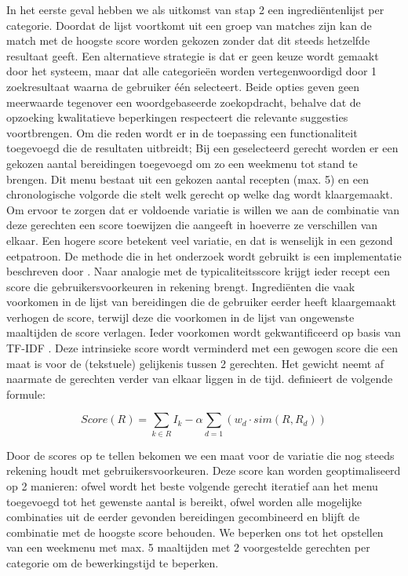 \documentclass{hogent-article}
\begin{document}
In het eerste geval hebben we als uitkomst van stap 2 een ingrediëntenlijst per categorie. Doordat de lijst voortkomt uit een groep van matches zijn kan de match met de hoogste score worden gekozen zonder dat dit steeds hetzelfde resultaat geeft. Een alternatieve strategie is dat er geen keuze wordt gemaakt door het systeem, maar dat alle categorieën worden vertegenwoordigd door 1 zoekresultaat waarna de gebruiker één selecteert.
Beide opties geven geen meerwaarde tegenover een woordgebaseerde zoekopdracht, behalve dat de opzoeking kwalitatieve beperkingen respecteert die relevante suggesties voortbrengen. Om die reden wordt er in de toepassing een functionaliteit toegevoegd die de resultaten uitbreidt; Bij een geselecteerd gerecht worden er een gekozen aantal bereidingen toegevoegd om zo een weekmenu tot stand te brengen. Dit menu bestaat uit een gekozen aantal recepten (max. 5) en een chronologische volgorde die stelt welk gerecht op welke dag wordt klaargemaakt. Om ervoor te zorgen dat er voldoende variatie is willen we aan de combinatie van deze gerechten een score toewijzen die aangeeft in hoeverre ze verschillen van elkaar. Een hogere score betekent veel variatie, en dat is wenselijk in een gezond eetpatroon. 
De methode die in het onderzoek wordt gebruikt is een implementatie beschreven door \textcite{Ueda2011}. Naar analogie met de typicaliteitsscore krijgt ieder recept een score die gebruikersvoorkeuren in rekening brengt. Ingrediënten die vaak voorkomen in de lijst van bereidingen die de gebruiker eerder heeft klaargemaakt verhogen de score, terwijl deze die voorkomen in de lijst van ongewenste maaltijden de score verlagen. Ieder voorkomen wordt gekwantificeerd op basis van TF-IDF \autocite{Karabiber2024}. Deze intrinsieke score wordt verminderd met een gewogen score die een maat is voor de (tekstuele) gelijkenis tussen 2 gerechten. Het gewicht neemt af naarmate de gerechten verder van elkaar liggen in de tijd. \textcite{Ueda2011} definieert de volgende formule:

\begin{equation}
    Score(R) = \sum_{k \in R}I_k - \alpha \sum_{d=1}(w_d \cdot sim(R,R_d))
\end{equation}

Door de scores op te tellen bekomen we een maat voor de variatie die nog steeds rekening houdt met gebruikersvoorkeuren. Deze score kan worden geoptimaliseerd op 2 manieren: ofwel wordt het beste volgende gerecht iteratief aan het menu toegevoegd tot het gewenste aantal is bereikt, ofwel worden alle mogelijke combinaties uit de eerder gevonden bereidingen gecombineerd en blijft de combinatie met de hoogste score behouden. We beperken ons tot het opstellen van een weekmenu met max. 5 maaltijden met 2 voorgestelde gerechten per categorie om de bewerkingstijd te beperken.
\end{document}
